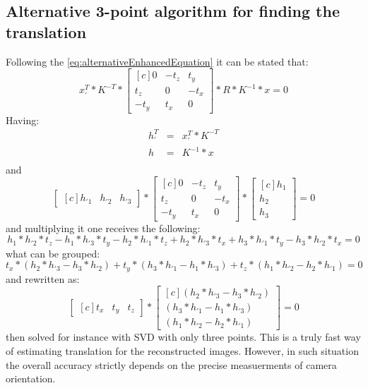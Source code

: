 \subsection{Alternative 3-point algorithm for finding the translation}
Following the \ref{eq:alternativeEnhancedEquation} it can be stated that:
\begin{equation} \label{eq:alternative3point}
{x}_{'}^{T} * K^{-T} * \begin{bmatrix*}[c]
 0 & -t_{z} & t_{y}\\
 t_{z} & 0 & -t_{x}\\
-t_{y} & t_{x} & 0 
\end{bmatrix*} * R * K^{-1} * x = 0
\end{equation}
Having:
\begin{equation} \label{eq:leftRelative}
\begin{array}{lcl}
h_{'}^{T} &=& {x}_{'}^{T} * K^{-T} \\
h &=& K^{-1} * x \\
\end{array}
\end{equation}
and 
\begin{equation} \label{eq:alternative3point}
\begin{bmatrix*}[c]
h_{'1} & h_{'2} & h_{'3}
\end{bmatrix*}
* \begin{bmatrix*}[c]
 0 & -t_{z} & t_{y}\\
 t_{z} & 0 & -t_{x}\\
-t_{y} & t_{x} & 0 
\end{bmatrix*} 
* \begin{bmatrix*}[c]
h_{1} \\
h_{2} \\
h_{3}
\end{bmatrix*}
= 0
\end{equation}
and multiplying it one receives the following:
\begin{equation} \label{eq:alternative3point}
h_{1}*h_{'2}*t_{z} - h_{1}*h_{'3}*t_{y} - h_{2}*h_{'1}*t_{z} + h_{2}*h_{'3}*t_{x} + h_{3}*h_{'1}*t_{y} - h_{3}*h_{'2}*t_{x}
= 0
\end{equation}
what can be grouped:
\begin{equation}
t_{x} * (h_{2}*h_{'3} - h_{3}*h_{'2}) + t_{y} * (h_{3}*h_{'1} - h_{1}*h_{'3}) + t_{z} * (h_{1}*h_{'2} - h_{2}*h_{'1}) = 0
\end{equation}
and rewritten as:
\begin{equation} \label{eq:translation3point}
\begin{bmatrix*}[c]
t_{x} &
t_{y} &
t_{z}
\end{bmatrix*} * \begin{bmatrix*}[c]
(h_{2}*h_{'3} - h_{3}*h_{'2}) \\ 
(h_{3}*h_{'1} - h_{1}*h_{'3}) \\
(h_{1}*h_{'2} - h_{2}*h_{'1}) 
\end{bmatrix*} 
= 0
\end{equation}
then solved for instance with SVD with only three points. This is a truly fast way of estimating translation for the reconstructed images. However, in such situation the overall accuracy strictly depends on the precise measuerments of camera orientation.
